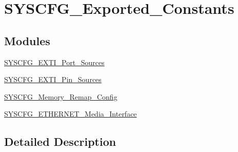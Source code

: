 \hypertarget{group___s_y_s_c_f_g___exported___constants}{}\section{S\+Y\+S\+C\+F\+G\+\_\+\+Exported\+\_\+\+Constants}
\label{group___s_y_s_c_f_g___exported___constants}
\subsection*{Modules}
\begin{DoxyCompactItemize}
\item 
\hyperlink{group___s_y_s_c_f_g___e_x_t_i___port___sources}{S\+Y\+S\+C\+F\+G\+\_\+\+E\+X\+T\+I\+\_\+\+Port\+\_\+\+Sources}
\item 
\hyperlink{group___s_y_s_c_f_g___e_x_t_i___pin___sources}{S\+Y\+S\+C\+F\+G\+\_\+\+E\+X\+T\+I\+\_\+\+Pin\+\_\+\+Sources}
\item 
\hyperlink{group___s_y_s_c_f_g___memory___remap___config}{S\+Y\+S\+C\+F\+G\+\_\+\+Memory\+\_\+\+Remap\+\_\+\+Config}
\item 
\hyperlink{group___s_y_s_c_f_g___e_t_h_e_r_n_e_t___media___interface}{S\+Y\+S\+C\+F\+G\+\_\+\+E\+T\+H\+E\+R\+N\+E\+T\+\_\+\+Media\+\_\+\+Interface}
\end{DoxyCompactItemize}


\subsection{Detailed Description}
